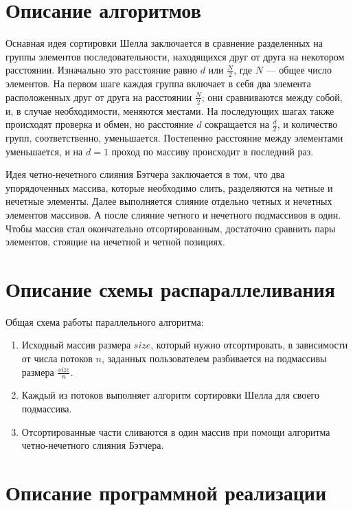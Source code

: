 \documentclass{report}
\begin{document}
\newpage

\section*{Описание алгоритмов}
Оснавная идея сортировки Шелла заключается в сравнение разделенных на группы элементов последовательности, находящихся друг от друга на некотором расстоянии. Изначально это расстояние равно $d$ или $\frac{N}{2}$, где $N$ — общее число элементов. На первом шаге каждая группа включает в себя два элемента расположенных друг от друга на расстоянии $\frac{N}{2}$; они сравниваются между собой, и, в случае необходимости, меняются местами. На последующих шагах также происходят проверка и обмен, но расстояние $d$ сокращается на $\frac{d}{2}$, и количество групп, соответственно, уменьшается. Постепенно расстояние между элементами уменьшается, и на $d=1$ проход по массиву происходит в последний раз.
\par Идея четно-нечетного слияния Бэтчера заключается в том, что два упорядоченных массива, которые необходимо слить, разделяются на четные и нечетные элементы. Далее выполняется слияние отдельно четных и нечетных элементов массивов. А после слияние четного и нечетного подмассивов в один. Чтобы массив стал окончательно отсортированным, достаточно сравнить пары элементов, стоящие на нечетной и четной позициях.
\newpage

\section*{Описание схемы распараллеливания}
Общая схема работы параллельного алгоритма:
\begin{enumerate}
\item Исходный массив размера $size$, который нужно отсортировать, в зависимости от числа потоков $n$, заданных пользователем разбивается на  подмассивы размера $\frac{size}{n}$.
\item Каждый из потоков выполняет алгоритм сортировки Шелла для своего подмассива.
\item Отсортированные части сливаются в один массив при помощи алгоритма четно-нечетного слияния Бэтчера.
\end{enumerate}
\newpage

\section*{Описание программной реализации}
\end{document}
